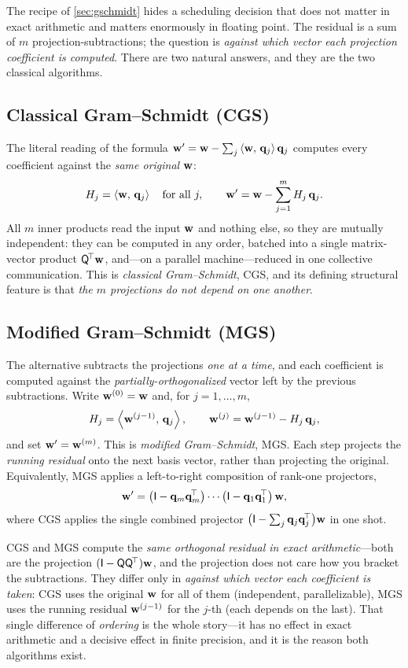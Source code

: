 The recipe of \cref{sec:gschmidt} hides a scheduling decision that does not matter
in exact arithmetic and matters enormously in floating point. The residual is a sum
of $m$ projection-subtractions; the question is \emph{against which vector each
projection coefficient is computed}. There are two natural answers, and they are the
two classical algorithms.

\subsection{Classical Gram--Schmidt (CGS)}

The literal reading of the formula
$\mathbf{w}' = \mathbf{w} - \sum_j \left\langle \mathbf{w},\, \mathbf{q}_j\right\rangle\mathbf{q}_j$ computes every coefficient against the
\emph{same original} $\mathbf{w}$:
\[
  H_j = \left\langle \mathbf{w},\, \mathbf{q}_j\right\rangle \quad\text{for all } j, \qquad
  \mathbf{w}' = \mathbf{w} - \sum_{j=1}^m H_j\,\mathbf{q}_j .
\]
All $m$ inner products read the input $\mathbf{w}$ and nothing else, so they are mutually
independent: they can be computed in any order, batched into a single matrix-vector
product $\mathsf{Q}^{\!\top}\mathbf{w}$, and---on a parallel machine---reduced in one
collective communication. This is \emph{classical Gram--Schmidt}, CGS, and its
defining structural feature is that \emph{the $m$ projections do not depend on one
another}.

\subsection{Modified Gram--Schmidt (MGS)}

The alternative subtracts the projections \emph{one at a time}, and each coefficient
is computed against the \emph{partially-orthogonalized} vector left by the previous
subtractions. Write $\mathbf{w}^{(0)} = \mathbf{w}$ and, for $j = 1, \dots, m$,
\[
  H_j = \left\langle \mathbf{w}^{(j-1)},\, \mathbf{q}_j\right\rangle, \qquad
  \mathbf{w}^{(j)} = \mathbf{w}^{(j-1)} - H_j\,\mathbf{q}_j,
\]
and set $\mathbf{w}' = \mathbf{w}^{(m)}$. This is \emph{modified Gram--Schmidt}, MGS. Each step
projects the \emph{running residual} onto the next basis vector, rather than
projecting the original. Equivalently, MGS applies a left-to-right composition of
rank-one projectors,
\[
  \mathbf{w}' = \bigl(\mathsf{I} - \mathbf{q}_m\mathbf{q}_m^{\!\top}\bigr)\cdots
         \bigl(\mathsf{I} - \mathbf{q}_1\mathbf{q}_1^{\!\top}\bigr)\,\mathbf{w},
\]
where CGS applies the single combined projector
$\bigl(\mathsf{I} - \sum_j \mathbf{q}_j\mathbf{q}_j^{\!\top}\bigr)\mathbf{w}$ in one shot.

\begin{keyidea}
CGS and MGS compute the \emph{same orthogonal residual in exact arithmetic}---both
are the projection $(\mathsf{I} - \mathsf{Q}\mathsf{Q}^{\!\top})\mathbf{w}$, and the projection does
not care how you bracket the subtractions. They differ only in
\emph{against which vector each coefficient is taken}: CGS uses the original $\mathbf{w}$
for all of them (independent, parallelizable), MGS uses the running residual
$\mathbf{w}^{(j-1)}$ for the $j$-th (each depends on the last). That single difference of
\emph{ordering} is the whole story---it has no effect in exact arithmetic and a
decisive effect in finite precision, and it is the reason both algorithms exist.
\end{keyidea}

